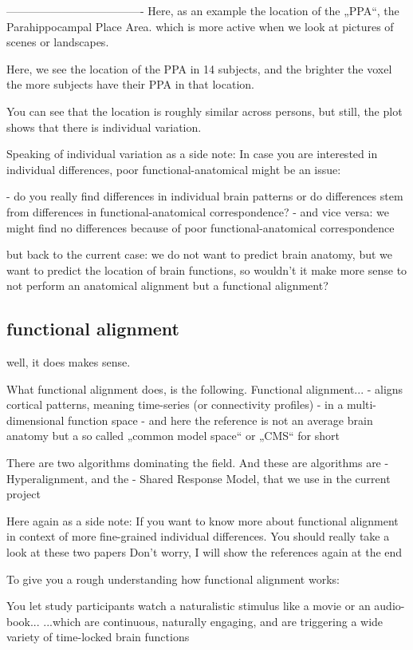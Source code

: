 -------------------------------------
Here, as an example the location of the „PPA“,
the Parahippocampal Place Area.
which is more active when we look at pictures of scenes or landscapes.

Here, we see the location of the PPA in 14 subjects,
and the brighter the voxel the more subjects have their PPA in that location.

You can see that the location is roughly similar across persons, but still,
the plot shows that there is individual variation.

Speaking of individual variation as a side note:
In case you are interested in individual differences,
poor functional-anatomical might be an issue:

- do you really find differences in individual brain patterns or
  do differences stem from differences in
  functional-anatomical correspondence?
- and vice versa: we might find no differences because of
  poor functional-anatomical correspondence

but back to the current case:
we do not want to predict brain anatomy,
but we want to predict the location of brain functions,
so wouldn’t it make more sense to not
perform an anatomical alignment but a functional alignment?


\subsection{functional alignment}

well, it does makes sense.

What functional alignment does, is the following.
Functional alignment...
- aligns cortical patterns, meaning time-series (or connectivity profiles)
- in a multi-dimensional function space
- and here the reference is not an average brain anatomy
  but a so called „common model space“ or „CMS“ for short

There are two algorithms dominating the field.
And these are algorithms are
- Hyperalignment, and the
- Shared Response Model, that we use in the current project

Here again as a side note:
If you want to know more about functional alignment in context of more
fine-grained individual differences.
You should really take a look at these two papers
Don’t worry, I will show the references again at the end


To give you a rough understanding how functional alignment works:

You let study participants watch a naturalistic stimulus like a movie or an audio-book...
...which are continuous, naturally engaging,
and are triggering a wide variety of time-locked brain functions

